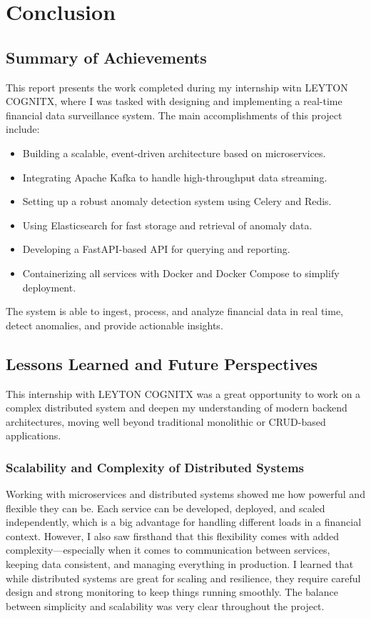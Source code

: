 \chapter{Conclusion}

\section{Summary of Achievements}
This report presents the work completed during my internship witn LEYTON COGNITX, where I was tasked with designing and implementing a real-time financial data surveillance system. The main accomplishments of this project include:
\begin{itemize}
    \item Building a scalable, event-driven architecture based on microservices.
    \item Integrating Apache Kafka to handle high-throughput data streaming.
    \item Setting up a robust anomaly detection system using Celery and Redis.
    \item Using Elasticsearch for fast storage and retrieval of anomaly data.
    \item Developing a FastAPI-based API for querying and reporting.
    \item Containerizing all services with Docker and Docker Compose to simplify deployment.
\end{itemize}
The system is able to ingest, process, and analyze financial data in real time, detect anomalies, and provide actionable insights.

\section{Lessons Learned and Future Perspectives}

This internship with LEYTON COGNITX was a great opportunity to work on a complex distributed system and deepen my understanding of modern backend architectures, moving well beyond traditional monolithic or CRUD-based applications.

\subsection{Scalability and Complexity of Distributed Systems}
Working with microservices and distributed systems showed me how powerful and flexible they can be. Each service can be developed, deployed, and scaled independently, which is a big advantage for handling different loads in a financial context. However, I also saw firsthand that this flexibility comes with added complexity—especially when it comes to communication between services, keeping data consistent, and managing everything in production. I learned that while distributed systems are great for scaling and resilience, they require careful design and strong monitoring to keep things running smoothly. The balance between simplicity and scalability was very clear throughout the project.

